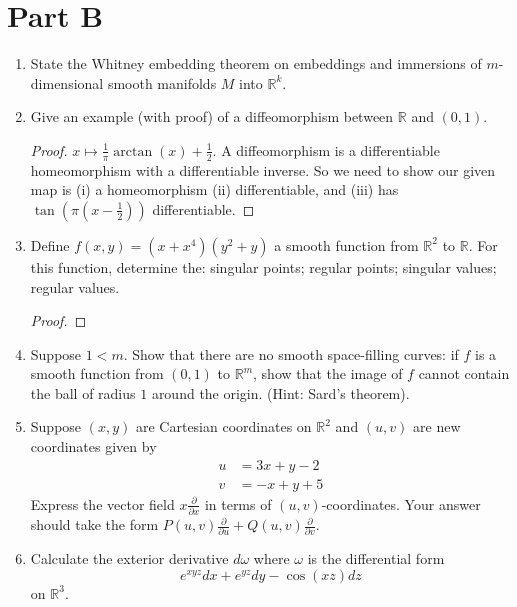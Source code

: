 \documentclass{article}
\begin{document}
\section*{Part B}
\begin{enumerate}
	\item State the Whitney embedding theorem on embeddings and immersions of 
	$m$-dimensional smooth manifolds $M$ into $\mathbb{R}^k$.
	

	\item Give an example (with proof) of a diffeomorphism between $\mathbb{R}$ and $(0,1)$.
	
	\begin{proof}
	$x \mapsto \frac{1}{\pi} \arctan(x) + \frac{1}{2}$.
	A diffeomorphism is a differentiable homeomorphism with a differentiable inverse.
	So we need to show our given map is (i) a homeomorphism (ii) differentiable, and (iii) has $\tan(\pi(x-\frac{1}{2}))$ differentiable.
	
	\end{proof}
	
	\item Define $f(x,y) = (x+x^4)(y^2+y)$ a smooth function from $\mathbb{R}^2$ to $\mathbb{R}$. For this function, determine the: singular points; regular points; singular values; regular values.
	
	\begin{proof}

	\end{proof}
	
	\item Suppose $1 < m$. Show that there are no smooth space-filling curves: if $f$
	is a smooth function from $(0,1)$ to $\mathbb{R}^m$, show that the image of $f$ cannot contain the ball of radius $1$ around the origin. (Hint: Sard's theorem).
	
	\item Suppose $(x,y)$ are Cartesian coordinates on $\mathbb{R}^2$ and $(u,v)$ are new coordinates given by 
	\begin{align*}
		u &= 3x+y-2\\
		v &= -x+y+5
	\end{align*}
	Express the vector field $x \frac{\partial}{\partial x}$ in terms of $(u,v)$-coordinates. Your answer should take the form $P(u,v) \frac{\partial}{\partial u} + Q(u,v) \frac{\partial}{\partial v}$.
	
	\item Calculate the exterior derivative $d\omega$ where $\omega$ is the differential form \[ e^{xyz} dx + e^{yz} dy - \cos(xz)dz \] on $\mathbb{R}^3$.
	
	

\end{enumerate}
\end{document}
